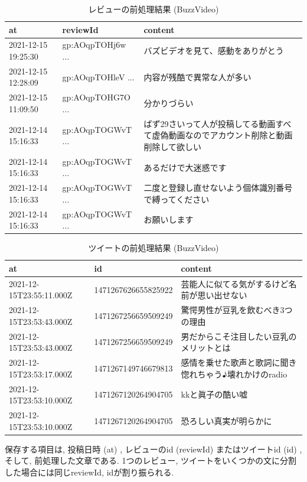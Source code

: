 \begin{table}[H]
  \caption{レビューの前処理結果 (BuzzVideo) }
  \label{tb:googlecsv}
  \begin{center}
  \begin{tabularx}{\linewidth}{|l|l|X|}
    \hline
    at&reviewId&content\\\hline\hline
    2021-12-15 19:25:30&gp:AOqpTOHj6w ...&バズビデオを見て、感動をありがとう\\\hline
    2021-12-15 12:28:09&gp:AOqpTOHleV ...&内容が残酷で異常な人が多い\\\hline
    2021-12-15 11:09:50&gp:AOqpTOHG7O ...&分かりづらい\\\hline
    2021-12-14 15:16:33&gp:AOqpTOGWvT ...&ばず29さいって人が投稿してる動画すべて虚偽動画なのでアカウント削除と動画削除して欲しい\\\hline
    2021-12-14 15:16:33&gp:AOqpTOGWvT ...&あるだけで大迷惑です\\\hline
    2021-12-14 15:16:33&gp:AOqpTOGWvT ...&二度と登録し直せないよう個体識別番号で縛ってください\\\hline
    2021-12-14 15:16:33&gp:AOqpTOGWvT ...&お願いします\\\hline
  \end{tabularx}\end{center}
\end{table}

\begin{table}[H]
  \caption{ツイートの前処理結果 (BuzzVideo) }
  \label{tb:twittercsv}
  \begin{center}
  \begin{tabularx}{\linewidth}{|l|l|X|}
    \hline
    at&id&content\\\hline\hline
    2021-12-15T23:55:11.000Z&1471267626655825922&芸能人に似てる気がするけど名前が思い出せない\\\hline
    2021-12-15T23:53:43.000Z&1471267256659509249&驚愕男性が豆乳を飲むべき3つの理由\\\hline
    2021-12-15T23:53:43.000Z&1471267256659509249&男だからこそ注目したい豆乳のメリットとは\\\hline
    2021-12-15T23:53:17.000Z&1471267149746679813&感情を乗せた歌声と歌詞に聞き惚れちゃう♪壊れかけのradio\\\hline
    2021-12-15T23:53:10.000Z&1471267120264904705&kkと眞子の酷い嘘\\\hline
    2021-12-15T23:53:10.000Z&1471267120264904705&恐ろしい真実が明らかに\\\hline
  \end{tabularx}\end{center}
\end{table}
保存する項目は, 投稿日時 (at) , レビューのid (reviewId) またはツイートid (id) , そして, 前処理した文章である. 
1つのレビュー, ツイートをいくつかの文に分割した場合には同じreviewId, idが割り振られる. 

